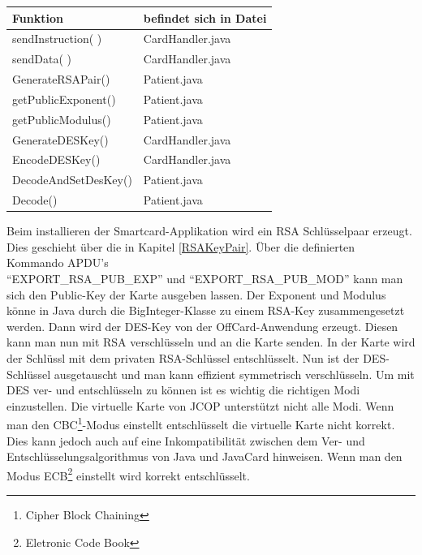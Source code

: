 \documentclass[parskip]{scrartcl}
\begin{document}
		\begin{table}[H]
			\centering
			\begin{tabular}[c]{|l|l|}
				\hline Funktion & befindet sich in Datei \\ 
				\hline
				\hline sendInstruction( ) & CardHandler.java \\ 
				\hline sendData( ) & CardHandler.java \\ 
				\hline GenerateRSAPair()  & Patient.java \\ 
				\hline getPublicExponent() & Patient.java \\ 
				\hline getPublicModulus() & Patient.java \\ 
				\hline GenerateDESKey() & CardHandler.java \\ 
				\hline EncodeDESKey() & CardHandler.java \\
				\hline DecodeAndSetDesKey() & Patient.java \\
				\hline Decode() & Patient.java \\
				\hline 
			\end{tabular} 
		\end{table}
		
		\newpage
		Beim installieren der Smartcard-Applikation wird ein RSA Schlüsselpaar erzeugt. Dies geschieht über die in Kapitel \ref{RSAKeyPair}. Über die definierten Kommando APDU's \\\enquote{EXPORT\_RSA\_PUB\_EXP} und \enquote{EXPORT\_RSA\_PUB\_MOD} kann man sich den Pub\-lic-Key der Karte ausgeben lassen. Der Exponent und Modulus könne in Java durch die BigInteger-Klasse zu einem RSA-Key zusammengesetzt werden. Dann wird der DES-Key von der OffCard-Anwendung erzeugt. Diesen kann man nun mit RSA verschlüsseln und an die Karte senden. In der Karte wird der Schlüssl mit dem privaten RSA-Schlüssel entschlüsselt. Nun ist der DES-Schlüssel ausgetauscht und man kann effizient symmetrisch verschlüsseln. Um mit DES ver- und entschlüsseln zu können ist es wichtig die richtigen Modi einzustellen. Die virtuelle Karte von JCOP unterstützt nicht alle Modi. Wenn man den CBC\footnote{Cipher Block Chaining}-Modus einstellt entschlüsselt die virtuelle Karte nicht korrekt. Dies kann jedoch auch auf eine Inkompatibilität zwischen dem Ver- und Entschlüsselungsalgorithmus von Java und JavaCard hinweisen. Wenn man den Modus ECB\footnote{Eletronic Code Book} einstellt wird korrekt entschlüsselt. 
\end{document}
